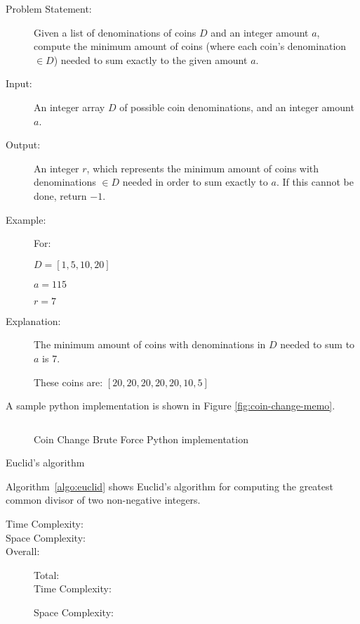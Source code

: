 \begin{description}
    \item[Problem Statement:]
        Given a list of denominations of coins $D$ and an integer amount $a$, compute the minimum amount of coins (where each coin's denomination $\in D$) needed to sum exactly to the given amount $a$.
        
    \item[Input:] 
        An integer array $D$ of possible coin denominations, and an integer amount $a$.
        
    \item[Output:] 
        An integer $r$, which represents the minimum amount of coins with denominations $\in D$ needed in order to sum exactly to $a$. If this cannot be done, return $-1$.
        
    \item[Example:]
        For: 

        $D = [1, 5, 10, 20]$

        $a = 115$

        $r = 7$

    \item[Explanation:]
        The minimum amount of coins with denominations in $D$ needed to sum to $a$ is 7.

        These coins are: $[20,20,20,20,20,10,5]$


\end{description}

A sample python implementation is shown in Figure \ref{fig:coin-change-memo}.

\begin{figure}[H]
    \centering
    \begin{lstlisting}

    \end{lstlisting}
    \caption{Coin Change Brute Force Python implementation}
    \label{fig:coin-change-bf}
\end{figure}


\begin{algorithm}
    \caption{Euclid's algorithm}
    \label{algo:euclid}
\end{algorithm}

Algorithm~\ref{algo:euclid} shows Euclid's algorithm for computing the greatest common divisor of two non-negative integers.


\begin{description}
    \item[Time Complexity:]
        
        
    \item[Space Complexity:] 
        
        
    \item[Overall:] Total:\\
        Time Complexity:
        
        Space Complexity:
        

\end{description}